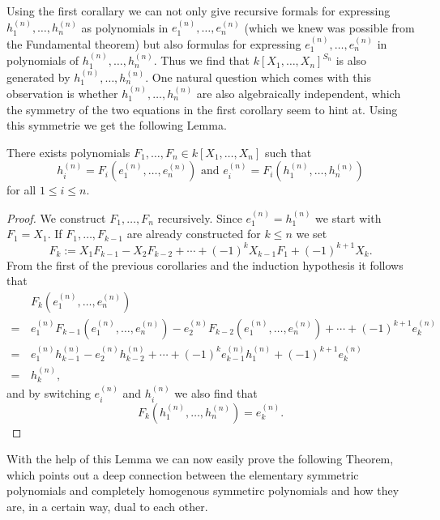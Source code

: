 Using the first corallary we can not only give recursive formals for expressing $h^{(n)}_1, \dotsc, h^{(n)}_n$ as polynomials in $e^{(n)}_1, \dotsc, e^{(n)}_n$ (which we knew was possible from the Fundamental theorem) but also formulas for expressing $e^{(n)}_1, \dotsc, e^{(n)}_n$ in polynomials of $h^{(n)}_1, \dotsc, h^{(n)}_n$. Thus we find that $k[X_1, \dotsc, X_n]^{S_n}$ is also generated by $h^{(n)}_1, \dotsc, h^{(n)}_n$. One natural question which comes with this observation is whether $h^{(n)}_1, \dotsc, h^{(n)}_n$ are also algebraically independent, which the symmetry of the two equations in the first corollary seem to hint at. Using this symmetrie we get the following Lemma.


\begin{lem}
 There exists polynomials $F_1, \dotsc, F_n \in k[X_1, \dotsc, X_n]$ such that
 \[
  h^{(n)}_i = F_i\left(e^{(n)}_1, \dotsc, e^{(n)}_n\right) \text{ and }
  e^{(n)}_i = F_i\left(h^{(n)}_1, \dotsc, h^{(n)}_n\right)
 \]
 for all $1 \leq i \leq n$.
\end{lem}
\begin{proof}
 We construct $F_1, \dotsc, F_n$ recursively. Since $e^{(n)}_1 = h^{(n)}_1$ we start with $F_1 = X_1$. If $F_1, \dotsc, F_{k-1}$ are already constructed for $k \leq n$ we set
 \[
  F_k := X_1 F_{k-1} - X_2 F_{k-2} + \dotsb + (-1)^k X_{k-1} F_1 + (-1)^{k+1} X_k.
 \]
 From the first of the previous corollaries and the induction hypothesis it follows that
 \begin{align*}
   &\, F_k\left(e^{(n)}_1, \dotsc, e^{(n)}_n\right) \\
  =&\, e^{(n)}_1 F_{k-1}\left(e^{(n)}_1, \dotsc, e^{(n)}_n\right) - e^{(n)}_2 F_{k-2}\left(e^{(n)}_1, \dotsc, e^{(n)}_n\right) + \dotsb + (-1)^{k+1} e^{(n)}_k \\
  =&\, e^{(n)}_1 h^{(n)}_{k-1} - e^{(n)}_2 h^{(n)}_{k-2} + \dotsb + (-1)^k e^{(n)}_{k-1} h^{(n)}_1 + (-1)^{k+1} e^{(n)}_k \\
  =&\, h^{(n)}_k,
 \end{align*}
 and by switching $e^{(n)}_i$ and $h^{(n)}_i$ we also find that
 \[
  F_k\left(h^{(n)}_1, \dotsc, h^{(n)}_n\right) = e^{(n)}_k.
 \]
\end{proof}


With the help of this Lemma we can now easily prove the following Theorem, which points out a deep connection between the elementary symmetric polynomials and completely homogenous symmetirc polynomials and how they are, in a certain way, dual to each other.



